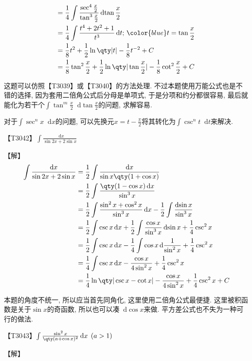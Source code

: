 \documentclass{ctexbook}
\newcommand*{\dif}{\mathop{}\!\mathrm{d}}
\begin{document}
{\begin{align*}
={}&\frac{1}{4}\int\frac{\sec^{4}{\frac{x}{2}}}{\tan^{3}{\frac{x}{2}}}\dif{\tan{\frac{x}{2}}}\\
={}&\frac{1}{4}\int\frac{t^{4}+2t^{2}+1}{t^{3}}\dif{t};\,{\color{blue}t=\tan{\frac{x}{2}}}\\
={}&\frac{1}{8}t^{2}+\frac{1}{2}\ln\qty|t|-\frac{1}{8}t^{-2}+C\\
={}&\frac{1}{8}\tan^{2}{\frac{x}{2}}+\frac{1}{2}\ln\qty|\tan{\frac{x}{2}}|-\frac{1}{8}\cot^{2}{\frac{x}{2}}+C
\end{align*}\par
{\kaishu 这题可以仿照【T3039】或{\color{red}【T3040】}的方法处理. 不过本题使用万能公式也是不错的选择, 因为套用二倍角公式后分母是单项式, 于是分项和约分都很容易, 最后就能化为若干个$\int\tan^{m}{\frac{x}{2}}\dif{\tan{\frac{x}{2}}}$的问题, 求解容易. \par
对于$\int\sec^{n}{x}\dif{x}$的问题, 可以先换元$x=t-\frac{\pi}{2}$将其转化为$\int\csc^{n}{t}\dif{t}$来解决. \par}
{\color{red}【T3042】}$\int\frac{\dif{x}}{\sin{2x}+2\sin{x}}$\par
【解】
\begin{align*}
\int\frac{\dif{x}}{\sin{2x}+2\sin{x}}={}&\frac{1}{2}\int\frac{\dif{x}}{\sin{x}\qty(1+\cos{x})}\\
={}&\frac{1}{2}\int\frac{\qty(1-\cos{x})\dif{x}}{\sin^{3}{x}}\\
={}&\frac{1}{2}\int\frac{\sin^{2}{x}+\cos^{2}{x}}{\sin^{3}{x}}\dif{x}-\frac{1}{2}\int\frac{\dif{\sin{x}}}{\sin^{3}{x}}\\
={}&\frac{1}{2}\int\csc{x}\dif{x}+\frac{1}{2}\int\frac{\cos{x}}{\sin^{3}{x}}\dif{\sin{x}}+\frac{1}{4}\csc^{2}{x}\\
={}&\frac{1}{2}\int\csc{x}\dif{x}-\frac{1}{4}\int\cos{x}\dif{\frac{1}{\sin^{2}{x}}}+\frac{1}{4}\csc^{2}{x}\\
={}&\frac{1}{4}\int\csc{x}\dif{x}-\frac{\cos{x}}{4\sin^{2}{x}}+\frac{1}{4}\csc^{2}{x}\\
={}&\frac{1}{4}\ln\qty|\csc{x}-\cot{x}|-\frac{\cos{x}}{4\sin^{2}{x}}+\frac{1}{4}\csc^{2}{x}+C
\end{align*}\par
{\kaishu 本题的角度不统一, 所以应当首先同角化, 这里使用二倍角公式最便捷. 这里被积函数是关于$\sin{x}$的奇函数, 所以也可以凑$\dif{\cos{x}}$来做. 平方差公式也不失为一种可行的做法. \par}
【T3043】$\int\frac{\sin^{2}{x}}{\qty(a+\cos{x})^{2}}\dif{x}\;\left(a>1\right)$\par
【解】
\begin{align*}

\end{align*}}
\end{document}
